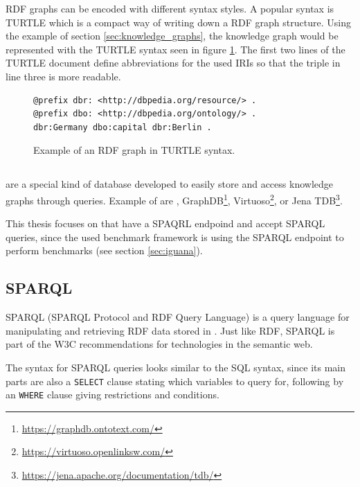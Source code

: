 RDF graphs can be encoded with different syntax styles.
A popular syntax is TURTLE \cite{RDFTurtle} which is a compact way of writing down a RDF graph structure.
Using the example of section \ref{sec:knowledge_graphs}, the knowledge graph would be represented with the TURTLE syntax seen in figure \ref{fig:rdf_turtle}.
The first two lines of the TURTLE document define abbreviations for the used IRIs so that the triple in line three is more readable.

\begin{figure}[tbph]
	\begin{lstlisting}
@prefix dbr: <http://dbpedia.org/resource/> .
@prefix dbo: <http://dbpedia.org/ontology/> .
dbr:Germany dbo:capital dbr:Berlin .
	\end{lstlisting}
	\caption{Example of an RDF graph in TURTLE syntax.}
	\label{fig:rdf_turtle}
\end{figure}


\subsection{\ts{}}
\label{sec:triplestores}
\tsp{} are a special kind of database developed to easily store and access knowledge graphs through queries.
Example of \tsp{} are \tentris{} \cite{bigerlTentrisTensorBasedTriple2020}, GraphDB\footnote{\url{https://graphdb.ontotext.com/}}, Virtuoso\footnote{\url{https://virtuoso.openlinksw.com/}}, or Jena TDB\footnote{\url{https://jena.apache.org/documentation/tdb/}}.

This thesis focuses on \tsp{} that have a SPAQRL endpoind and accept SPARQL queries, since the used benchmark framework \iguana{} is using the SPARQL endpoint to perform benchmarks (see section \ref{sec:iguana}).


\subsection{SPARQL}
\label{sec:sparql}
SPARQL (SPARQL Protocol and RDF Query Language) \cite{harrisSPARQLQueryLanguage} is a query language for manipulating and retrieving RDF data stored in \tsp{}.
Just like RDF, SPARQL is part of the W3C recommendations for technologies in the semantic web.

The syntax for SPARQL queries looks similar to the SQL syntax, since its main parts are also a \texttt{SELECT} clause stating which variables to query for, following by an \texttt{WHERE} clause giving restrictions and conditions.


